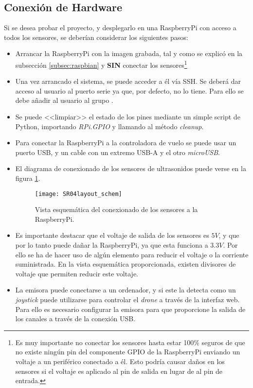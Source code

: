 \subsection{Conexión de Hardware}

Si se desea probar el proyecto, y desplegarlo en una RaspberryPi con acceso a todos los sensores, se deberían considerar los siguientes pasos: 

\begin{itemize}
\item Arrancar la RaspberryPi con la imagen grabada, tal y como se explicó en la subsección \ref{subsec:raspbian} y \textbf{SIN} conectar los sensores\footnote{Es muy importante no conectar los sensores hasta estar 100\% seguros de que no existe ningún pin del componente GPIO de la RaspberryPi enviando un voltaje a un periférico conectado a él. Esto podría causar daños en los sensores si el voltaje es aplicado al pin de salida en lugar de al pin de entrada.}
\item Una vez arrancado el sistema, se puede acceder a él vía SSH. Se deberá dar acceso al usuario al puerto serie ya que, por defecto, no lo tiene. Para ello se debe añadir al usuario al grupo .
\item Se puede <<limpiar>> el estado de los pines mediante un simple script de Python, importando \emph{RPi.GPIO} y llamando al método \emph{cleanup}.
\item Para conectar la RaspberryPi a la controladora de vuelo se puede usar un puerto USB, y un cable con un extremo USB-A y el otro \emph{microUSB}.
\item El diagrama de conexionado de los sensores de ultrasonidos puede verse en la figura \ref{fig:concepHCPi}. 
\begin{figure}[H]
	\centering
	\texttt{[image: SR04layout\_schem]}
	\caption[Diagrama de conexión de sensores a RaspberryPi]{Vista esquemática del conexionado de los sensores a la RaspberryPi.}\label{fig:concepHCPi}
\end{figure}
\item Es importante destacar que el voltaje de salida de los sensores es $5V$, y que por lo tanto puede dañar la RaspberryPi, ya que esta funciona a $3.3V$. Por ello se ha de hacer uso de algún elemento para reducir el voltaje o la corriente suministrada. En la vista esquemática proporcionada, existen divisores de voltaje que permiten reducir este voltaje. 
\item La emisora puede conectarse a un ordenador, y si este la detecta como un \emph{joystick} puede utilizarse para controlar el \emph{drone} a través de la interfaz web. Para ello es necesario configurar la emisora para que proporcione la salida de los canales a través de la conexión USB. 
\end{itemize}



